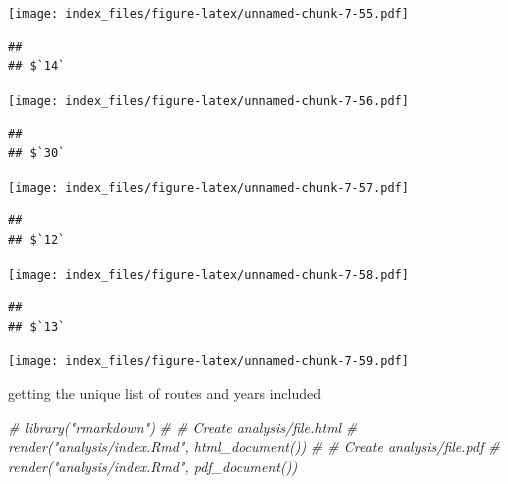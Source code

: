 \documentclass[]{article}
\newenvironment{Shaded}{\begin{snugshade}}{\end{snugshade}}
\newcommand{\CommentTok}[1]{\textcolor[rgb]{0.56,0.35,0.01}{\textit{#1}}}
\begin{document}
\texttt{[image: index\_files/figure-latex/unnamed-chunk-7-55.pdf]}

\begin{verbatim}
## 
## $`14`
\end{verbatim}

\texttt{[image: index\_files/figure-latex/unnamed-chunk-7-56.pdf]}

\begin{verbatim}
## 
## $`30`
\end{verbatim}

\texttt{[image: index\_files/figure-latex/unnamed-chunk-7-57.pdf]}

\begin{verbatim}
## 
## $`12`
\end{verbatim}

\texttt{[image: index\_files/figure-latex/unnamed-chunk-7-58.pdf]}

\begin{verbatim}
## 
## $`13`
\end{verbatim}

\texttt{[image: index\_files/figure-latex/unnamed-chunk-7-59.pdf]}

getting the unique list of routes and years included

\begin{Shaded}
\begin{Highlighting}[]
\CommentTok{# library("rmarkdown")}
\CommentTok{# # Create analysis/file.html}
\CommentTok{# render("analysis/index.Rmd", html_document())}
\CommentTok{# # Create analysis/file.pdf}
\CommentTok{# render("analysis/index.Rmd", pdf_document())}
\end{Highlighting}
\end{Shaded}
\end{document}
